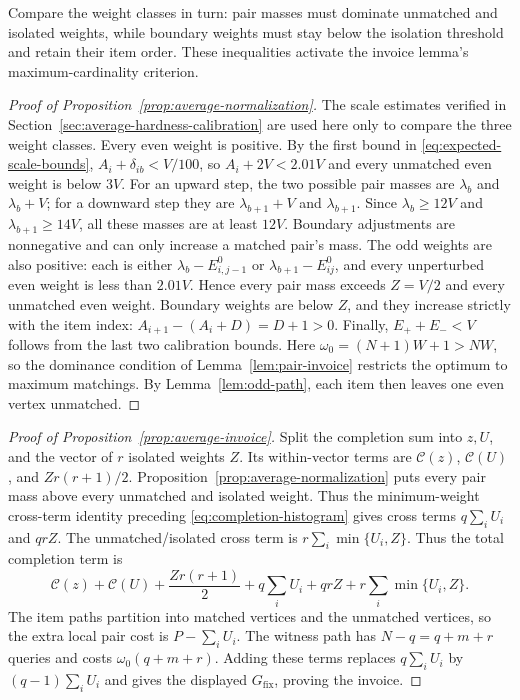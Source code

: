 \begin{proofstrategy}
Compare the weight classes in turn: pair masses must dominate unmatched
and isolated weights, while boundary weights must stay below the
isolation threshold and retain their item order. These inequalities
activate the invoice lemma's maximum-cardinality criterion.
\end{proofstrategy}
\begin{proof}[Proof of Proposition~\ref{prop:average-normalization}]
The scale estimates verified in Section~\ref{sec:average-hardness-calibration}
are used here only to compare the three weight classes.
Every even weight is positive. By the first bound in
\eqref{eq:expected-scale-bounds}, $A_i+\delta_{ib}<V/100$, so
$A_i+2V<2.01V$ and every unmatched even weight is below $3V$.
For an upward step, the two possible pair masses are
$\lambda_b$ and $\lambda_b+V$; for a downward step they are
$\lambda_{b+1}+V$ and $\lambda_{b+1}$. Since
$\lambda_b\ge12V$ and $\lambda_{b+1}\ge14V$, all these masses are
at least $12V$. Boundary adjustments are nonnegative and can only
increase a matched pair's mass. The odd weights are also positive:
each is either $\lambda_b-E^0_{i,j-1}$ or
$\lambda_{b+1}-E^0_{ij}$, and every unperturbed even weight is
less than $2.01V$. Hence every pair mass exceeds $Z=V/2$ and every
unmatched even weight.
Boundary weights are below $Z$, and they increase strictly with the
item index: $A_{i+1}-(A_i+D)=D+1>0$. Finally,
$E_++E_-<V$ follows from the last two calibration bounds.
Here $\omega_0=(N+1)W+1>NW$, so the dominance condition of
Lemma~\ref{lem:pair-invoice} restricts the optimum to maximum
matchings. By Lemma~\ref{lem:odd-path}, each item then leaves
one even vertex unmatched.
\end{proof}

\begin{proof}[Proof of Proposition~\ref{prop:average-invoice}]
Split the completion sum into $z,U$, and the vector of $r$
isolated weights $Z$. Its within-vector terms are
$\mathcal C(z)$, $\mathcal C(U)$, and $Zr(r+1)/2$.
Proposition~\ref{prop:average-normalization} puts every pair mass
above every unmatched and isolated weight. Thus the minimum-weight
cross-term identity preceding \eqref{eq:completion-histogram} gives
cross terms
$q\sum_iU_i$ and $qrZ$. The unmatched/isolated cross term is
$r\sum_i\min\{U_i,Z\}$. Thus the total completion term is
\[
 \mathcal C(z)+\mathcal C(U)+\frac{Zr(r+1)}2
       +q\sum_iU_i+qrZ+r\sum_i\min\{U_i,Z\}.
\]
The item paths partition into matched vertices and the unmatched
vertices, so the extra local pair cost is $P-\sum_iU_i$.
The witness path has $N-q=q+m+r$ queries and costs
$\omega_0(q+m+r)$. Adding these terms replaces $q\sum_iU_i$
by $(q-1)\sum_iU_i$ and gives the displayed
$G_{\mathrm{fix}}$, proving the invoice.
\end{proof}

